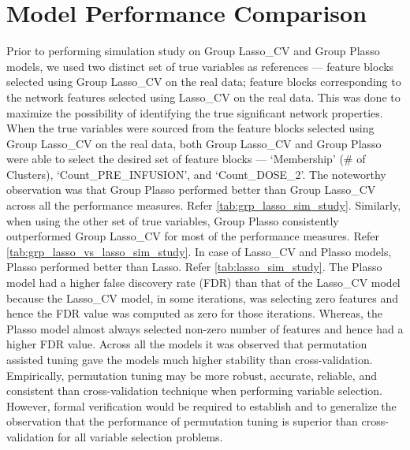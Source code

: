 \section{Model Performance Comparison} \label{sec:perf_measure}
Prior to performing simulation study on Group Lasso\_CV and Group Plasso models, we used two distinct set of true variables as references --- feature blocks selected using Group Lasso\_CV on the real data; feature blocks corresponding to the network features selected using Lasso\_CV on the real data. This was done to maximize the possibility of identifying the true significant network properties. When the true variables were sourced from the feature blocks selected using Group Lasso\_CV on the real data, both Group Lasso\_CV and Group Plasso were able to select the desired set of feature blocks --- \lq Membership' (\# of Clusters), \lq Count\_PRE\_INFUSION', and \lq Count\_DOSE\_2'. The noteworthy observation was that Group Plasso performed better than Group Lasso\_CV across all the performance measures. Refer \autoref{tab:grp_lasso_sim_study}. Similarly, when using the other set of true variables, Group Plasso consistently outperformed Group Lasso\_CV for most of the performance measures. Refer \autoref{tab:grp_lasso_vs_lasso_sim_study}. In case of Lasso\_CV and Plasso models, Plasso performed better than Lasso. Refer \autoref{tab:lasso_sim_study}. The Plasso model had a higher false discovery rate (FDR) than that of the Lasso\_CV model because the Lasso\_CV model, in some iterations, was selecting zero features and hence the FDR value was computed as zero for those iterations. Whereas, the Plasso model almost always selected non-zero number of features and hence had a higher FDR value. Across all the models it was observed that permutation assisted tuning gave the models much higher stability than cross-validation. Empirically, permutation tuning may be more robust, accurate, reliable, and consistent than cross-validation technique when performing variable selection. However, formal verification would be required to establish and to generalize the observation that the performance of permutation tuning is superior than cross-validation for all variable selection problems.\par 

